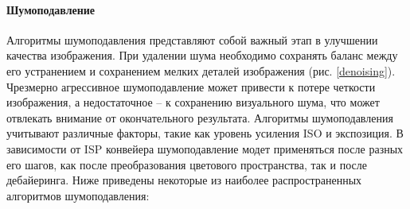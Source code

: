 \paragraph{Шумоподавление}


Алгоритмы шумоподавления \cite{lib-denoising} представляют собой важный этап в улучшении качества изображения. При удалении шума необходимо сохранять баланс между его устранением и сохранением мелких деталей изображения (рис. \ref{denoising}). Чрезмерно агрессивное шумоподавление может привести к потере четкости изображения, а недостаточное – к сохранению визуального шума, что может отвлекать внимание от окончательного результата. Алгоритмы шумоподавления учитывают различные факторы, такие как уровень усиления ISO и экспозиция. В зависимости от ISP конвейера шумоподавление модет применяться после разных его шагов, как после преобразования цветового пространства, так и после дебайеринга. Ниже приведены некоторые из наиболее распространенных алгоритмов шумоподавления:


